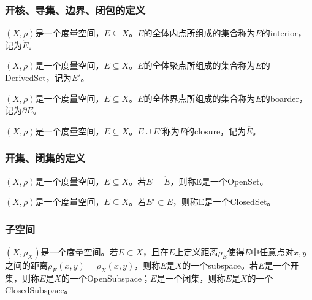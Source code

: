 \subsubsection{开核、导集、边界、闭包的定义}
\begin{definition}
	$(X,\rho)$是一个度量空间，$E\subseteq X$。$E$的全体内点所组成的集合称为$E$的\gls{interior}，记为$\mathring{E}$。
\end{definition}
\begin{definition}
	$(X,\rho)$是一个度量空间，$E\subseteq X$。$E$的全体聚点所组成的集合称为$E$的\gls{DerivedSet}，记为$E'$。
\end{definition}
\begin{definition}
	$(X,\rho)$是一个度量空间，$E\subseteq X$。$E$的全体界点所组成的集合称为$E$的\gls{boarder}，记为$\partial E$。
\end{definition}
\begin{definition}
	$(X,\rho)$是一个度量空间，$E\subseteq X$。$E\cup E'$称为$E$的\gls{closure}，记为$\overline{E}$。
\end{definition}
\subsubsection{开集、闭集的定义}
\begin{definition}
	$(X,\rho)$是一个度量空间，$E\subseteq X$。若$E=\mathring{E}$，则称E是一个\gls{OpenSet}。
\end{definition}
\begin{definition}
	$(X,\rho)$是一个度量空间，$E\subseteq X$。若$E'\subset E$，则称E是一个\gls{ClosedSet}。
\end{definition}
\subsubsection{子空间}
\begin{definition}
	$(X,\rho_X)$是一个度量空间。若$E\subset X$，且在$E$上定义距离$\rho_E$使得$E$中任意点对$x,y$之间的距离$\rho_E(x,y)=\rho_X(x,y)$，则称$E$是$X$的一个\gls{subspace}。若$E$是一个开集，则称$E$是$X$的一个\gls{OpenSubspace}；$E$是一个闭集，则称$E$是$X$的一个\gls{ClosedSubspace}。
\end{definition}

